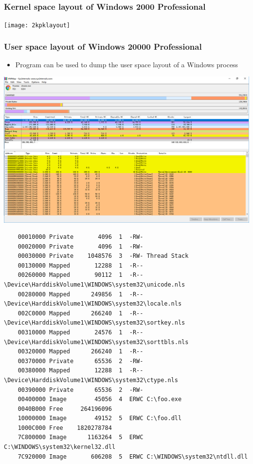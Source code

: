 \documentclass[CJKutf8,xcolor=pdftex,dvipsnames,table]{beamer}
\begin{document}
\begin{CJK*}{UTF8}{song}
  \begin{frame}
    \frametitle{Kernel space layout of Windows 2000 Professional} \pause
    \begin{center}
      \texttt{[image: 2kpklayout]}
    \end{center}
  \end{frame}

  \begin{frame}[fragile]
    \frametitle{User space layout of Windows 20000 Professional} \pause
    \begin{itemize}\parskip=0pt
    \item{Program  can be used to dump the user space layout of a Windows process} \pause
    \end{itemize}
    \begin{center}
		\includegraphics[scale=0.3]{vmmap}
	\end{center}

\iffalse

    {\tiny
\begin{verbatim}
    00010000 Private       4096  1  -RW-
    00020000 Private       4096  1  -RW-
    00030000 Private    1048576  3  -RW- Thread Stack
    00130000 Mapped       12288  1  -R--
    00260000 Mapped       90112  1  -R-- \Device\HarddiskVolume1\WINDOWS\system32\unicode.nls
    00280000 Mapped      249856  1  -R-- \Device\HarddiskVolume1\WINDOWS\system32\locale.nls
    002C0000 Mapped      266240  1  -R-- \Device\HarddiskVolume1\WINDOWS\system32\sortkey.nls
    00310000 Mapped       24576  1  -R-- \Device\HarddiskVolume1\WINDOWS\system32\sorttbls.nls
    00320000 Mapped      266240  1  -R--
    00370000 Private      65536  2  -RW-
    00380000 Mapped       12288  1  -R-- \Device\HarddiskVolume1\WINDOWS\system32\ctype.nls
    00390000 Private      65536  2  -RW-
    00400000 Image        45056  4  ERWC C:\foo.exe
    0040B000 Free     264196096
    10000000 Image        49152  5  ERWC C:\foo.dll
    1000C000 Free    1820278784
    7C800000 Image      1163264  5  ERWC C:\WINDOWS\system32\kernel32.dll
    7C920000 Image       606208  5  ERWC C:\WINDOWS\system32\ntdll.dll
\end{verbatim}
    }


\end{frame}
\end{CJK*}
\end{document}
